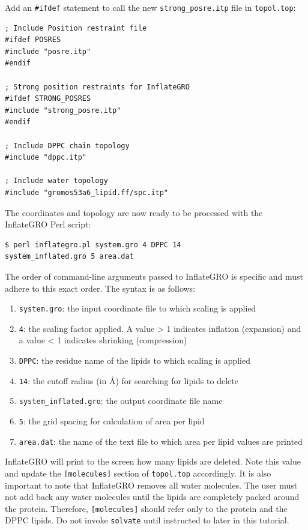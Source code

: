 \documentclass[9pt,tutorial]{livecoms}
\begin{document}
Add an \texttt{\#ifdef} statement to call the new \texttt{strong\_posre.itp} file in \texttt{topol.top}:

\begin{verbatim}
; Include Position restraint file
#ifdef POSRES
#include "posre.itp"
#endif

; Strong position restraints for InflateGRO
#ifdef STRONG_POSRES
#include "strong_posre.itp"
#endif

; Include DPPC chain topology
#include "dppc.itp"

; Include water topology
#include "gromos53a6_lipid.ff/spc.itp"
\end{verbatim}

The coordinates and topology are now ready to be processed with the InflateGRO Perl script:

\begin{verbatim}
$ perl inflategro.pl system.gro 4 DPPC 14 
system_inflated.gro 5 area.dat
\end{verbatim}

The order of command-line arguments passed to InflateGRO is specific and must adhere to this exact order. The syntax is as follows:

\begin{enumerate}
	\item{\texttt{system.gro}: the input coordinate file to which scaling is applied}
	\item{\texttt{4}: the scaling factor applied. A value > 1 indicates inflation (expansion) and a value < 1 indicates shrinking (compression)}
	\item{\texttt{DPPC}: the residue name of the lipids to which scaling is applied}
	\item{\texttt{14}: the cutoff radius (in \AA) for searching for lipids to delete}
	\item{\texttt{system\_inflated.gro}: the output coordinate file name}
	\item{\texttt{5}: the grid spacing for calculation of area per lipid}
	\item{\texttt{area.dat}: the name of the text file to which area per lipid values are printed}
\end{enumerate}

InflateGRO will print to the screen how many lipids are deleted. Note this value and update the \texttt{[molecules]} section of \texttt{topol.top} accordingly. It is also important to note that InflateGRO removes all water molecules. The user must not add back any water molecules until the lipids are completely packed around the protein. Therefore, \texttt{[molecules]} should refer only to the protein and the DPPC lipids. Do not invoke \texttt{solvate} until instructed to later in this tutorial.
\end{document}
